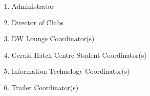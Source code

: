 \begin{enumerate}
  \begin{enumerate}
   \item
    Administrator
   \item
    Director of Clubs
   \item
    DW Lounge Coordinator(s)
   \item
    Gerald Hatch Centre Student Coordinator(s)
   \item
    Information Technology Coordinator(s)
   \item
    Trailer Coordinator(s)

  \end{enumerate}
\end{enumerate}